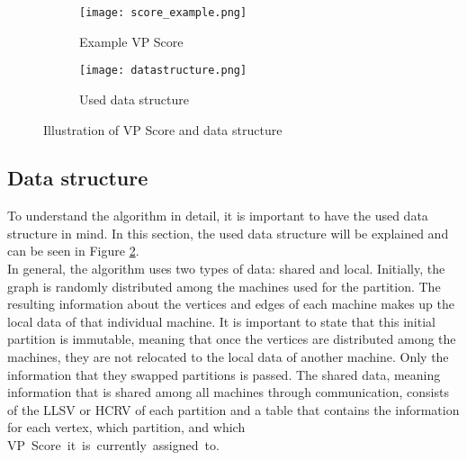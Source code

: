 \documentclass[acmsmall,nonacm,screen,review]{acmart}
\begin{document}
\begin{figure}[bt!]
     \centering
     \begin{subfigure}[b]{0.45\textwidth}
         \centering
         \texttt{[image: score\_example.png]}
         \caption{Example VP Score}
         \label{vp_score}
     \end{subfigure}
     \hfill
     \begin{subfigure}[b]{0.45\textwidth}
         \centering
         \texttt{[image: datastructure.png]}
         \caption{Used data structure}
         \label{data_structure}
     \end{subfigure}
     \caption{Illustration of VP Score and data structure}
     \label{combi}
\end{figure}
\subsection{Data structure}
To understand the algorithm in detail, it is important to have the used data structure in mind. In this section, the used data structure will be explained and can be seen in Figure \ref{data_structure}. \\
In general, the algorithm uses two types of data: shared and local. Initially, the graph is randomly distributed among the machines used for the partition. The resulting information about the vertices and edges of each machine makes up the local data of that individual machine. It is important to state that this initial partition is immutable, meaning that once the vertices are distributed among the machines, they are not relocated to the local data of another machine. Only the information that they swapped partitions is passed. The shared data, meaning information that is shared among all machines through communication, consists of the LLSV or HCRV of each partition and a table that contains the information for each vertex, which partition, and which \hbox{VP Score it is currently assigned to.}
\end{document}
